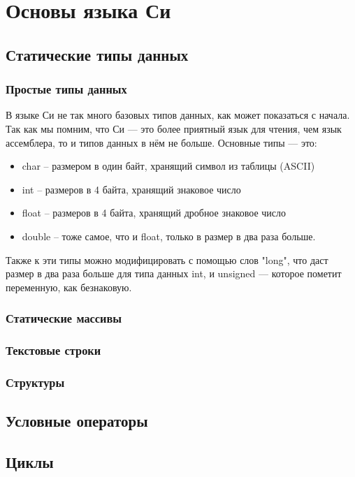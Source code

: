 \documentclass{bmstu}
\begin{document}
\chapter{Основы языка Си}
\section{Статические типы данных}
\subsection{Простые типы данных}
В языке Си не так много базовых типов данных, как может показаться с начала. Так как мы помним, что Си --- это более приятный язык для чтения, чем язык ассемблера, то и типов данных в нём не больше. Основные типы --- это:
\begin{itemize}
\item char   -- размером в один байт, хранящий символ из таблицы (ASCII)
\item int    -- размеров в 4 байта, хранящий знаковое число
\item float  -- размеров в 4 байта, хранящий дробное знаковое число
\item double -- тоже самое, что и float, только в размер в два раза больше.
\end{itemize}
Также к эти типы можно модифицировать с помощью слов "long", что даст размер в два раза больше для типа данных int, и unsigned --- которое пометит переменную, как безнаковую.


\subsection{Статические массивы}


\subsection{Текстовые строки}
\subsection{Структуры}
\section{Условные операторы}
\section{Циклы}
\end{document}
